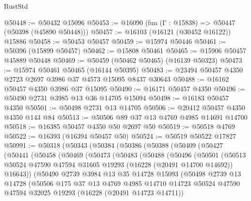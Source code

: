 \begin{lexlean}{RustStd}
\begin{coremodule}
@50448 := @50432 @15096
@50453 := @16090 (fun (Γ : @15838) => @50447 (@50398 (@45890 @50448)))
@50457 := @16103 (@16121 (@30452 @16122)) @15886
@50458 := @50453 @50457
@50459 := @15974 @50446
@50461 := @50396 (@15899 @50457)
@50462 := @15808 @50461
@50465 := @15906 @50457 @45889 @50448
@50469 := @50459 (@50462 @50465) (@16139 @50323)
@50473 := @15974 @50461 @50465 (@16144 @50395)
@50483 := @23494 @50457 @4350 @2723 @2697 @3986 @37 @4573 @15095 @8437 @30643
@50488 := @16162 @50457 @4350 @3986 @37 @15095
@50490 := @16171 @50457 @4350
@50496 := @50490 @2731 @3985 @13 @36 @14705 @15094
@50498 := @16183 @50457 @4350
@50501 := @50498 @2731 @13 @14705
@50506 := @20412 @50457 @4350 @4350 @143 @84
@50513 := @50506 @89 @37 @13 @4769 @4985 @14691 @14700
@50518 := @16385 @50457 @4350 @50 @2697 @50
@50519 := @50518 @4769
@50522 := @16393 (@16394 @50457 @50)
@50524 := @50519 @50522 @17827
@50991 := @50318
    (@50343
      (@50384
        (@50386
          (@50388
            (@50409
              (@50427
                (@50441
                  (@50458
                    (@50469
                      (@50473
                        (@50483
                          (@50488
                            (@50496
                              (@50501
                                (@50513
                                  @50524
                                  @47590
                                  @47594
                                  @31605
                                  @19293
                                  (@16228 (@20491 @14700 @14692))
                                  @16643))
                              (@50490
                                @2739
                                @3984
                                @13
                                @35
                                @14728
                                @15093
                                (@50498
                                  @2739
                                  @13
                                  @14728
                                  (@50506
                                    @175
                                    @37
                                    @13
                                    @4769
                                    @4985
                                    @14710
                                    @14723
                                    @50524
                                    @47590
                                    @47594
                                    @32025
                                    @19293
                                    (@16228 (@20491 @14723 @14711))

\end{coremodule}
\end{lexlean}
